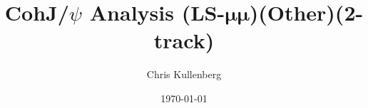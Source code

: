 \title{CohJ/$\psi$ Analysis (\textbf{LS}-$\boldsymbol{\mu\mu}$)(\textbf{Other})(\textbf{2-track})}
\author{Chris Kullenberg}
\date{\today}

